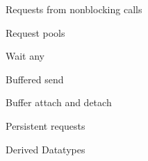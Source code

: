 \documentclass[10pt]{beamer}
\begin{document}
\begin{numberedframe}{Requests from nonblocking calls}
  
\end{numberedframe}
\begin{numberedframe}{Request pools}
  
\end{numberedframe}
\begin{numberedframe}{Wait any}
  
\end{numberedframe}
\begin{exerciseframe}[setdiff]
  
\end{exerciseframe}

\begin{numberedframe}{Buffered send}
  
\end{numberedframe}
\begin{numberedframe}{Buffer attach and detach}
  
\end{numberedframe}
\begin{numberedframe}{Persistent requests}
  
\end{numberedframe}

 {Derived Datatypes}
\end{document}
